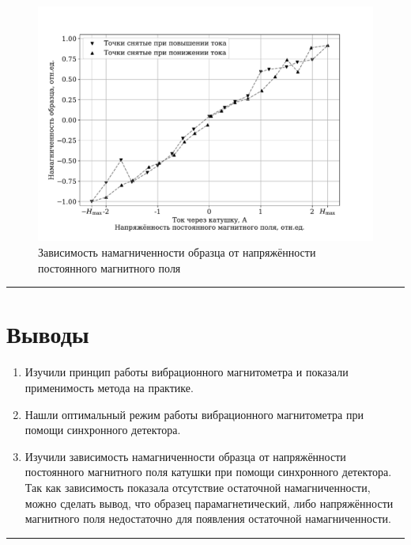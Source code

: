 \documentclass[a4paper,12pt]{article} %
\begin{document}
\begin{figure}[h]
\centering
\includegraphics[width=\textwidth]{plot_2.pdf}
\caption{\centering Зависимость намагниченности образца от напряжённости постоянного магнитного поля}
\label{fig:plot_2}
\end{figure}


\medskip\hrule\medskip

\section{Выводы}

\begin{enumerate}
\item Изучили принцип работы вибрационного магнитометра и показали применимость метода на практике.
\item Нашли оптимальный режим работы вибрационного магнитометра при помощи синхронного детектора.
\item Изучили зависимость намагниченности образца от напряжённости постоянного магнитного поля катушки при помощи синхронного детектора. Так как зависимость показала отсутствие остаточной намагниченности, можно сделать вывод, что образец парамагнетический, либо напряжённости магнитного поля недостаточно для появления остаточной намагниченности.
\end{enumerate}

\medskip\hrule\medskip
\end{document}
